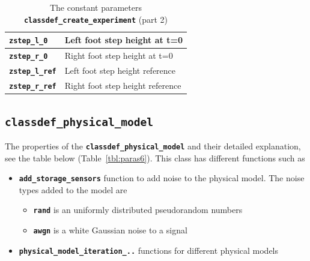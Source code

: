 \documentclass[12pt,oneside,notitlepage,abstracton,a4paper]{scrartcl}
\begin{document}
\begin{table}[!htbp]
\begin{center}
\begin{tabular}{|l|l|}
 \textbf{\texttt{zstep\_l\_0}}         & Left foot step height at t=0 \\ \hline 
 \textbf{\texttt{zstep\_r\_0}}         & Right foot step height at t=0\\ \hline  
 \textbf{\texttt{zstep\_l\_ref}}         & Left foot step height reference \\ \hline  
 \textbf{\texttt{zstep\_r\_ref}}         & Right foot step height reference\\ \hline  
\end{tabular}
\caption {The constant parameters \textbf{\texttt{classdef\_create\_experiment}} (part 2)}
\label{tbl:paras5}
\end{center}
\end{table} 


\nopagebreak
\pagebreak  
\subsection{\textbf{\texttt{classdef\_physical\_model}}} \label{cls_phy_mdl} 
The properties of the \textbf{\texttt{classdef\_physical\_model}} and their detailed explanation, see the table below (Table~\ref{tbl:paras6}). This class has different functions such as
\begin{itemize}
\item \textbf{\texttt{add\_storage\_sensors}} function to add noise to the physical model. The noise types added to the model are 
\begin{itemize}
\item \textbf{\texttt{rand}} is an uniformly distributed pseudorandom numbers 
\item \textbf{\texttt{awgn}} is a white Gaussian noise to a signal 
\end{itemize}
\item \textbf{\texttt{physical\_model\_iteration\_..}} functions for different physical models
\end{itemize}
\end{document}
